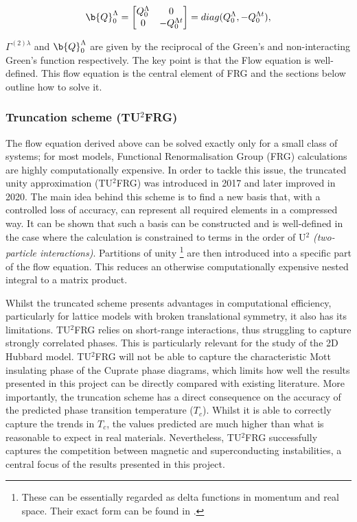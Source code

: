 \documentclass[12pt]{article}
\begin{document}
\begin{equation}\label{Q0 term }
\b{Q}_0^{\Lambda} =
\begin{bmatrix}
Q_0^{\Lambda} & 0 \\
0 & -Q_0^{\Lambda t}
\end{bmatrix}
= diag(Q_0^{\Lambda}, - Q_0^{\Lambda t}),
\end{equation}

\noindent $\Gamma^{(2)\lambda}$ and $\b{Q}_0^{\Lambda}$ are given by the reciprocal 
of the Green's and non-interacting Green's function respectively.
The key point is that the Flow equation is well-defined. 
This flow equation is the central element of FRG and the sections below outline how to solve it.


\subsubsection{Truncation scheme (TU$^2$FRG)}
\label{subsubsec:Truncation scheme}


The flow equation derived above can be solved exactly only for a small class of systems; for most models, Functional Renormalisation Group (FRG) 
calculations are highly computationally expensive.
In order to tackle this issue, the truncated unity approximation (TU$^2$FRG) was introduced in 2017\cite{lichtenstein2017high} and later improved in 2020\cite{eckhardt2020truncated}. 
The main idea behind this scheme is to find a new basis that, with a controlled loss of accuracy, can represent all 
required elements in a compressed way. It can be shown that such a basis can be constructed and is 
well-defined in the case where the calculation is constrained to terms in the order of U$^{2}$ \textit{(two-particle interactions)}\cite{lichtenstein2018functional}.
Partitions of unity \footnote{These can be essentially regarded as delta functions in momentum and real space. Their exact form can be found in \cite{lichtenstein2018functional}.} are then introduced into a specific part of the flow equation. This reduces an otherwise computationally expensive nested integral to a matrix product.\par
\medskip

\noindent Whilst the truncated scheme presents advantages in computational efficiency, particularly for lattice models with broken translational symmetry, it also has its limitations. 
TU$^2$FRG relies on short-range interactions, thus struggling to capture strongly correlated phases. 
This is particularly relevant for the study of the 2D Hubbard model. TU$^2$FRG will not be able to capture
the characteristic Mott insulating phase of the Cuprate phase diagrams\cite{imada1998metal}, which limits how well the results presented in this project can be directly compared with existing literature. 
More importantly, the truncation scheme has a direct consequence on the accuracy of the predicted phase transition temperature ($T_c$). Whilst it is able to correctly capture
the trends in $T_c$, the values predicted are much higher than what is reasonable to expect in real materials.
Nevertheless, TU$^2$FRG successfully captures the competition between magnetic and superconducting instabilities, a central focus of the results presented in this project. 
\end{document}

